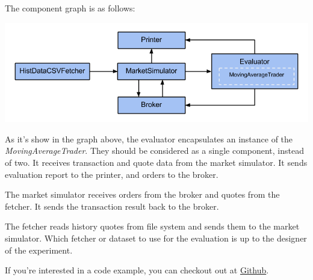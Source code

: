 The component graph is as follows:

\noindent
\includegraphics[width=\textwidth]{img/examples/evaluation}

As it's show in the graph above, the evaluator encapsulates an instance of the \emph{MovingAverageTrader}. They should be considered as a single component, instead of two. It receives transaction and quote data from the market simulator. It sends evaluation report to the printer, and orders to the broker.

The market simulator receives orders from the broker and quotes from the fetcher. It sends the transaction result back to the broker.

The fetcher reads history quotes from file system and sends them to the market simulator. Which fetcher or dataset to use for the evaluation is up to the designer of the experiment.

If you're interested in a code example, you can checkout out at \href{https://github.com/merlinND/TradingSimulation/blob/master/ts/src/main/scala/ch/epfl/ts/evaluation/EvaluationRunner.scala}{Github}.
